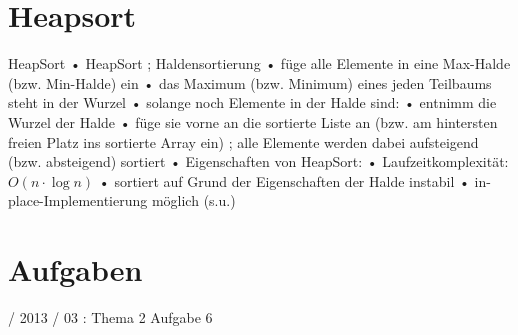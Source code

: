 \documentclass{lehramt-informatik}
\begin{document}

\chapter{Heapsort}

\begin{quellen}
\item \cite[Seite 45]{aud:fs:tafeluebung-11}
\item \cite{wiki:heapsort}
\item \cite[Seite 407-413 (PDF 424-429) 14.6.1
407
Sortieren
Sortieren mit Bäumen: HeapSort]{saake}
\end{quellen}

HeapSort
• HeapSort
; Haldensortierung
• füge alle Elemente in eine Max-Halde (bzw. Min-Halde) ein
• das Maximum (bzw. Minimum) eines jeden Teilbaums steht in der Wurzel
• solange noch Elemente in der Halde sind:
• entnimm die Wurzel der Halde
• füge sie vorne an die sortierte Liste an
(bzw. am hintersten freien Platz ins sortierte Array ein)
; alle Elemente werden dabei aufsteigend (bzw. absteigend) sortiert
• Eigenschaften von HeapSort:
• Laufzeitkomplexität:
$O( n \cdot \log n)$
• sortiert auf Grund der Eigenschaften der Halde instabil
• in-place-Implementierung möglich (s.u.)



\chapter{Aufgaben}

 / 2013 / 03 : Thema 2 Aufgabe 6

\literatur
\end{document}
